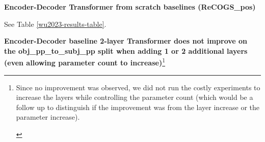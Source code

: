 \documentclass[11pt]{article}
\begin{document}
\textbf{\cite{Wu2023} Encoder-Decoder Transformer from scratch baselines (ReCOGS\_pos)}

See Table \ref{wu2023-results-table}.




\textbf{\cite{Wu2023} Encoder-Decoder baseline 2-layer Transformer does not improve on the obj\_pp\_to\_subj\_pp split when adding 1 or 2 additional layers}
\label{wu-baseline-layer-variation-experiment-results}
\textbf{(even allowing parameter count to increase)}\footnote{\begin{footnotesize}
Since no improvement was observed, we did not run the costly experiments to increase the layers while controlling the parameter count (which would be a follow up to distinguish if the improvement was from the layer increase or the parameter increase).
\end{footnotesize}
}
\end{document}
